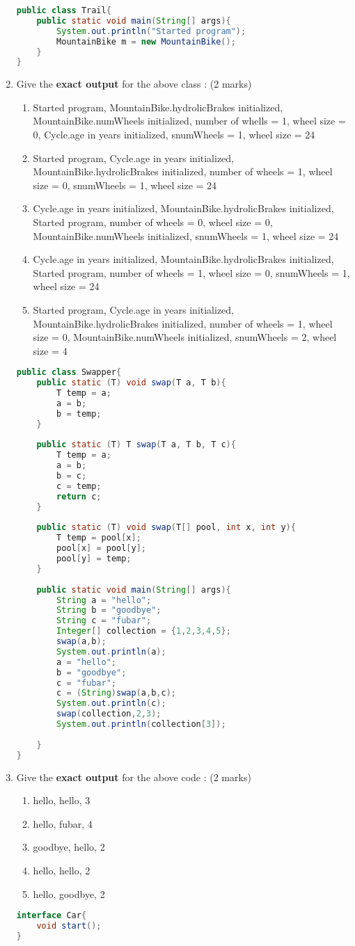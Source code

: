 \documentclass{article}
\begin{document}
\begin{enumerate}[label=\arabic* --,resume]
\begin{lstlisting}[language=Java, left=numbers]
public class Trail{
	public static void main(String[] args){
		System.out.println("Started program");
		MountainBike m = new MountainBike();
	}
}
\end{lstlisting}
	\item Give the \textbf{exact output} for the above class : (2 marks)
	\begin{enumerate}
		\item Started program, MountainBike.hydrolicBrakes initialized, MountainBike.numWheels initialized, number of whells = 1, wheel size = 0, Cycle.age in years initialized, snumWheels = 1, wheel size = 24
		\item Started program, Cycle.age in years initialized, MountainBike.hydrolicBrakes initialized, number of wheels = 1, wheel size = 0, snumWheels = 1, wheel size = 24
		\item Cycle.age in years initialized, MountainBike.hydrolicBrakes initialized, Started program, number of wheels = 0, wheel size = 0, MountainBike.numWheels initialized, snumWheels = 1, wheel size = 24
		\item Cycle.age in years initialized, MountainBike.hydrolicBrakes initialized, Started program, number of wheels = 1, wheel size = 0, snumWheels = 1, wheel size = 24
		\item Started program, Cycle.age in years initialized, MountainBike.hydrolicBrakes initialized, number of wheels = 1, wheel size = 0, MountainBike.numWheels initialized, snumWheels = 2, wheel size = 4
	\end{enumerate}
	\begin{lstlisting}[language=Java, left=numbers]
public class Swapper{
	public static (T) void swap(T a, T b){
		T temp = a;
		a = b;
		b = temp;
	}
	
	public static (T) T swap(T a, T b, T c){
		T temp = a;
		a = b;
		b = c;
		c = temp;
		return c;
	}
	
	public static (T) void swap(T[] pool, int x, int y){
		T temp = pool[x];
		pool[x] = pool[y];
		pool[y] = temp;
	}
	
	public static void main(String[] args){
		String a = "hello";
		String b = "goodbye";
		String c = "fubar";
		Integer[] collection = {1,2,3,4,5};
		swap(a,b);
		System.out.println(a);
		a = "hello";
		b = "goodbye";
		c = "fubar";
		c = (String)swap(a,b,c);
		System.out.println(c);
		swap(collection,2,3);
		System.out.println(collection[3]);
		
	}
}
	\end{lstlisting}
	\item Give the \textbf{exact output} for the above code : (2 marks)
	\begin{enumerate}
		\item hello, hello, 3
		\item hello, fubar, 4
		\item goodbye, hello, 2
		\item hello, hello, 2
		\item hello, goodbye, 2
	\end{enumerate}
	\begin{lstlisting}[language=Java, left=numbers]
interface Car{
	void start();
}


\end{lstlisting}
\end{enumerate}
\end{document}
